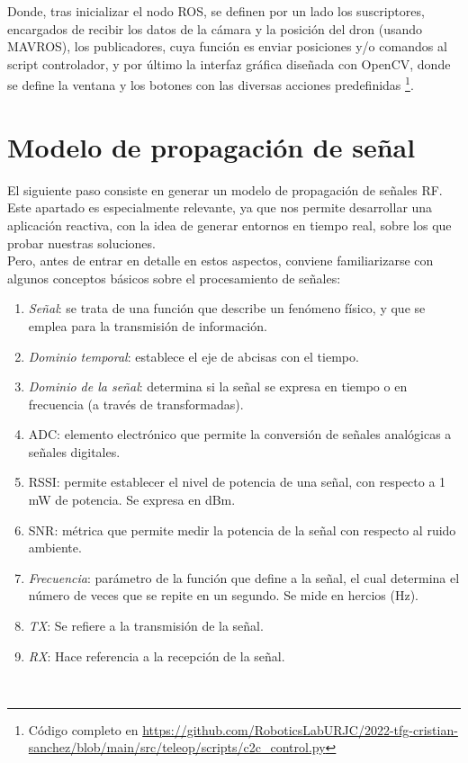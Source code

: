 Donde, tras inicializar el nodo \ac{ROS}, se definen por un lado los suscriptores, encargados de recibir los datos de la cámara y la posición del dron (usando MAVROS), los publicadores, cuya función es enviar posiciones y/o comandos al script controlador, y por último la interfaz gráfica diseñada con OpenCV, donde se define la ventana y los botones con las diversas acciones predefinidas \footnote{Código completo en \url{https://github.com/RoboticsLabURJC/2022-tfg-cristian-sanchez/blob/main/src/teleop/scripts/c2c_control.py}}.\\

\section{Modelo de propagación de señal}
\label{sec:signals}

El siguiente paso consiste en generar un modelo de propagación de señales \ac{RF}. Este apartado es especialmente relevante, ya que nos permite desarrollar una aplicación reactiva, con la idea de generar entornos en tiempo real, sobre los que probar nuestras soluciones.\\

Pero, antes de entrar en detalle en estos aspectos, conviene familiarizarse con algunos conceptos básicos sobre el procesamiento de señales:

\begin{enumerate}
	\item \emph{Señal}: se trata de una función que describe un fenómeno físico, y que se emplea para la transmisión de información.

    \item \emph{Dominio temporal}: establece el eje de abcisas con el tiempo.

    \item \emph{Dominio de la señal}: determina si la señal se expresa en tiempo o en frecuencia (a través de transformadas).

    \item \ac{ADC}: elemento electrónico que permite la conversión de señales analógicas a señales digitales.

    \item \ac{RSSI}: permite establecer el nivel de potencia de una señal, con respecto a 1 mW de potencia. Se expresa en dBm.

    \item \ac{SNR}: métrica que permite medir la potencia de la señal con respecto al ruido ambiente.

    \item \emph{Frecuencia}: parámetro de la función que define a la señal, el cual determina el número de veces que se repite en un segundo. Se mide en hercios (Hz).

    \item \emph{TX}: Se refiere a la transmisión de la señal.

    \item \emph{RX}: Hace referencia a la recepción de la señal.
\end{enumerate} \cite{basics-signals}\\


